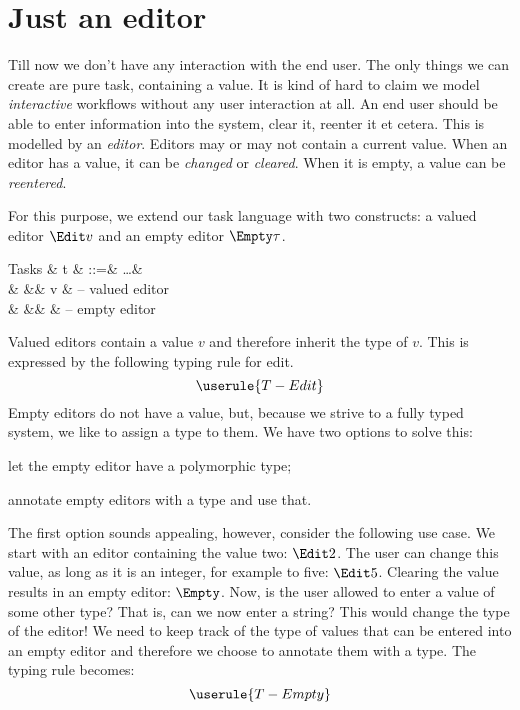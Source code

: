 
\section{Just an editor}

Till now we don't have any interaction with the end user.
The only things we can create are pure task, containing a value.
It is kind of hard to claim we model \emph{interactive} workflows without any user interaction at all.
An end user should be able to enter information into the system,
clear it, reenter it et cetera.
This is modelled by an \emph{editor}.
Editors may or may not contain a current value.
When an editor has a value, it can be \emph{changed} or \emph{cleared}.
When it is empty, a value can be \emph{reentered}.

For this purpose, we extend our task language with two constructs:
a valued editor $\Edit v$ and an empty editor $\Empty \tau$.
\begin{grammar}
  Tasks
    & t & ::=& \ldots      & \\
    &   &\mid& \Edit v     & – valued editor \\
    &   &\mid& \Empty \tau & – empty editor \\
\end{grammar}

Valued editors contain a value $v$ and therefore inherit the type of $v$.
This is expressed by the following typing rule for edit.
\begin{equation*}
  \userule{T-Edit}
\end{equation*}
Empty editors do not have a value,
but, because we strive to a fully typed system,
we like to assign a type to them.
We have two options to solve this:
\begin{enumerate*}
  \item let the empty editor have a polymorphic type;
  \item annotate empty editors with a type and use that.
\end{enumerate*}
The first option sounds appealing, however, consider the following use case.
We start with an editor containing the value two: $\Edit 2$.
The user can change this value, as long as it is an integer,
for example to five: $\Edit 5$.
Clearing the value results in an empty editor: $\Empty$.
Now, is the user allowed to enter a value of some other type?
That is, can we now enter a string?
This would change the type of the editor!
We need to keep track of the type of values that can be entered into an empty editor
and therefore we choose to annotate them with a type.
The typing rule becomes:
\begin{equation*}
  \userule{T-Empty}
\end{equation*}


